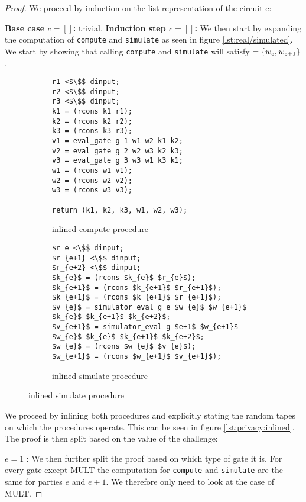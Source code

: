 \begin{proof}
  We proceed by induction on the list representation of the circuit c:

  \noindent \textbf{Base case $c = []$: } trivial.
  \noindent \textbf{Induction step $c = []$: }
  We then start by expanding the computation of \texttt{compute} and
  \texttt{simulate} as seen in figure \ref{lst:real/simulated}.
  We start by showing that calling \texttt{compute} and \texttt{simulate} will
  satisfy $=\{w_{e}, w_{e+1}\}$.

  \begin{figure}
    \caption{inlined procedures}
    \label{lst:privacy:inlined}
    \centering
    \begin{subfigure}{0.48\textwidth }
    \begin{lstlisting}[mathescape]
r1 <$\$$ dinput;
r2 <$\$$ dinput;
r3 <$\$$ dinput;
k1 = (rcons k1 r1);
k2 = (rcons k2 r2);
k3 = (rcons k3 r3);
v1 = eval_gate g 1 w1 w2 k1 k2;
v2 = eval_gate g 2 w2 w3 k2 k3;
v3 = eval_gate g 3 w3 w1 k3 k1;
w1 = (rcons w1 v1);
w2 = (rcons w2 v2);
w3 = (rcons w3 v3);

return (k1, k2, k3, w1, w2, w3);
    \end{lstlisting}
      \caption{inlined compute procedure}
    \end{subfigure}
    \hfill
    \begin{subfigure}{ 0.48\textwidth }
    \begin{lstlisting}[mathescape]
$r_e <\$$ dinput;
$r_{e+1} <\$$ dinput;
$r_{e+2} <\$$ dinput;
$k_{e}$ = (rcons $k_{e}$ $r_{e}$);
$k_{e+1}$ = (rcons $k_{e+1}$ $r_{e+1}$);
$k_{e+1}$ = (rcons $k_{e+1}$ $r_{e+1}$);
$v_{e}$ = simulator_eval g e $w_{e}$ $w_{e+1}$ $k_{e}$ $k_{e+1}$ $k_{e+2}$;
$v_{e+1}$ = simulator_eval g $e+1$ $w_{e+1}$ $w_{e}$ $k_{e}$ $k_{e+1}$ $k_{e+2}$;
$w_{e}$ = (rcons $w_{e}$ $v_{e}$);
$w_{e+1}$ = (rcons $w_{e+1}$ $v_{e+1}$);
    \end{lstlisting}
      \caption{inlined simulate procedure}
    \end{subfigure}
  \end{figure}

  We proceed by inlining both procedures and explicitly stating the random tapes
  on which the procedures operate. This can be seen in figure \ref{lst:privacy:inlined}.
  The proof is then split based on the value of the challenge:

  \noindent$e=1$ : We then further split the proof based on which type of gate
  it is. For every gate except MULT the computation for \texttt{compute} and
  \texttt{simulate} are the same for parties $e$ and $e+1$. We therefore only
  need to look at the case of MULT.


\end{proof}

